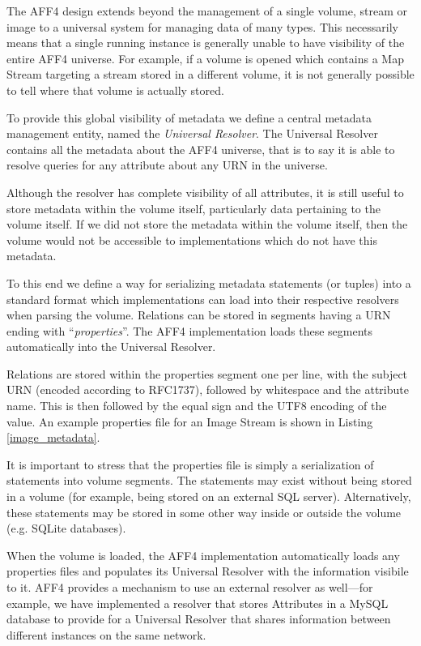 \documentclass[10pt, conference]{IEEEtran}
\begin{document}
The AFF4 design extends beyond the management of a single volume,
stream or image to a universal system for managing data of many
types. This necessarily means that a single running instance is
generally unable to have visibility of the entire AFF4 universe. For
example, if a volume is opened which contains a Map Stream targeting a
stream stored in a different volume, it is not generally possible to
tell where that volume is actually stored.

To provide this global visibility of metadata we define a central
metadata management entity, named the {\em Universal Resolver}. The
Universal Resolver contains all the metadata about the AFF4 universe,
that is to say it is able to resolve queries for any attribute about
any URN in the universe.

Although the resolver has complete visibility of all attributes, it is
still useful to store metadata within the volume itself, particularly
data pertaining to the volume itself. If we did not store the metadata
within the volume itself, then the volume would not be accessible to
implementations which do not have this metadata.

To this end we define a way for serializing metadata statements (or
tuples) into a standard format which implementations can load into
their respective resolvers when parsing the volume. Relations can be
stored in segments having a URN ending with ``{\em properties}''. The
AFF4 implementation loads these segments automatically into the
Universal Resolver.

Relations are stored within the properties segment one per line, with
the subject URN (encoded according to RFC1737), followed by whitespace
and the attribute name. This is then followed by the equal sign and
the UTF8 encoding of the value. An example properties file for an
Image Stream is shown in Listing \ref{image_metadata}.

It is important to stress that the properties file is simply a
serialization of statements into volume segments. The statements may
exist without being stored in a volume (for example, being stored on
an external SQL server). Alternatively, these statements may be stored
in some other way inside or outside the volume (e.g. SQLite
databases).

When the volume is loaded, the AFF4 implementation automatically loads
any properties files and populates its Universal Resolver with the
information visibile to it. AFF4 provides a mechanism to use an
external resolver as well---for example, we have implemented a
resolver that stores Attributes in a MySQL database to provide for a
Universal Resolver that shares information between different instances
on the same network.
\end{document}
